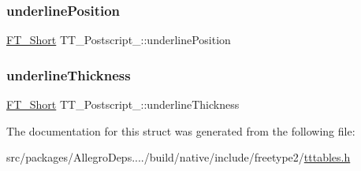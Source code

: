 \mbox{\label{struct_t_t___postscript___a909fd5064ab7547bb8ed984b5dfe2fe2}} 
\subsubsection{\texorpdfstring{underline\+Position}{underlinePosition}}
{\footnotesize\ttfamily \hyperlink{fttypes_8h_aa7279be89046a2563cd3d4d6651fbdcf}{F\+T\+\_\+\+Short} T\+T\+\_\+\+Postscript\+\_\+\+::underline\+Position}

\mbox{\label{struct_t_t___postscript___a4e4654766a4f27054c9a35958515e186}} 
\subsubsection{\texorpdfstring{underline\+Thickness}{underlineThickness}}
{\footnotesize\ttfamily \hyperlink{fttypes_8h_aa7279be89046a2563cd3d4d6651fbdcf}{F\+T\+\_\+\+Short} T\+T\+\_\+\+Postscript\+\_\+\+::underline\+Thickness}



The documentation for this struct was generated from the following file\+:\begin{DoxyCompactItemize}
\item 
src/packages/\+Allegro\+Deps..../build/native/include/freetype2/\hyperlink{tttables_8h}{tttables.\+h}\end{DoxyCompactItemize}

